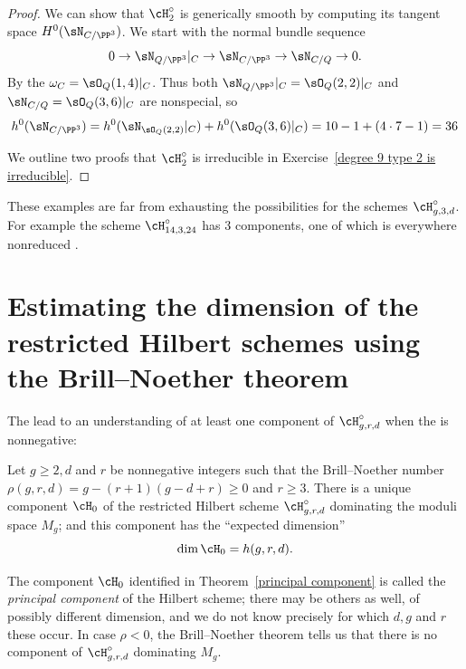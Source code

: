 \begin{proof}
We can show that $\cH^\circ_2$ is generically smooth by computing its
tangent space
$H^0(\sN_{C/\PP^3})$. We start with the normal bundle sequence
$$
0\to \sN_{Q/\PP^3}|_C \to \sN_{C/\PP^3} \to \sN_{C/Q} \to 0
.
$$
By the
%
$\omega_C = \sO_Q(1,4)|_C$.
Thus both $\sN_{Q/\PP^3}|_C = \sO_Q(2,2)|_C$ and
$\sN_{C/Q} = \sO_Q(3,6)|_C$ are nonspecial, so
$$
h^0 (\sN_{C/\PP^3}) = h^0(\sN_{\sO_Q(2,2)}|_C ) + h^0(\sO_Q(3,6)|_C)
= 10-1 + (4\cdot 7-1) = 36
$$

We outline two proofs that
$\cH^\circ_2$ is irreducible in Exercise~\ref{degree 9 type 2 is
irreducible}.
\end{proof}

These examples are far from exhausting the possibilities for the schemes
$\cH^{\circ}_{g,3,d}$. For example
the scheme $\cH^{\circ}_{14,3,24}$ has 3 components, one of which is
%
%
everywhere nonreduced \cite{Mumford1962,Nasu2008}.


\section{Estimating the dimension of the restricted Hilbert schemes
using the Brill--Noether theorem}\label{estimating dim hilb}

The
lead to an understanding of at least one
%
component of $\cH^{\circ}_{g,r,d}$ when
the
is nonnegative:
%

\begin{theorem}\label{principal component}
Let $g\geq 2, d$ and $r$ be nonnegative integers such that the
Brill--Noether number  $\rho(g,r,d) = g - (r+1)(g-d+r) \geq 0$
and $r\geq 3$.  There is a unique component $\cH_0$ of the restricted
Hilbert scheme $\cH^\circ_{g,r,d}$ dominating the moduli space $M_g$;
and this component has the ``expected dimension''
$$
\dim \cH_0 = h(g,r,d).
$$
\end{theorem}

 The component $\cH_0$ identified in Theorem~\ref{principal component}
 is called the \emph{principal component} of the Hilbert scheme; there
%
 may be others as well, of possibly different dimension, and we do not
 know precisely for which $d,g$ and $r$ these occur. In case $\rho <
 0$, the Brill--Noether theorem tells us that there is no component of
 $\cH^\circ_{g,r,d}$ dominating $M_g$.

